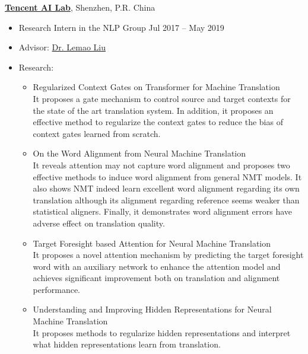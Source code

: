 {\bf \href{https://ai.tencent.com/ailab/en/index/}{Tencent AI Lab}}, Shenzhen, P.R. China
\begin{itemize}
    \item[] Research Intern in the NLP Group \hfill Jul 2017 -- May 2019
    \item[] Advisor: \href{https://lemaoliu.github.io/homepage/}{Dr. Lemao Liu}
    \item[] Research:
    \begin{itemize}
        \item Regularized Context Gates on Transformer for Machine Translation~\cite{li-etal-2020-regularized} \\
        It proposes a gate mechanism to control source and target contexts for the state of the art translation system.
        In addition, it proposes an effective method to regularize the context gates to reduce the bias of context gates learned from scratch.
        \item On the Word Alignment from Neural Machine Translation~\cite{li-etal-2019-word} \\
        It reveals attention may not capture word alignment and proposes two effective methods to induce word alignment from general NMT models.
        It also shows NMT indeed learn excellent word alignment regarding its own translation although its alignment regarding reference seems weaker than statistical aligners.
        Finally, it demonstrates word alignment errors have adverse effect on translation quality.
        \item Target Foresight based Attention for Neural Machine Translation~\cite{li-etal-2018-target, li2021attending} \\
        It proposes a novel attention mechanism by predicting the target foresight word with an auxiliary network to enhance the attention model and achieves significant improvement both on translation and alignment performance.
        \item Understanding and Improving Hidden Representations for Neural Machine Translation~\cite{li-etal-2019-understanding-improving} \\
        It proposes methods to regularize hidden representations and interpret what hidden representations learn from translation.
    \end{itemize}
\end{itemize}


